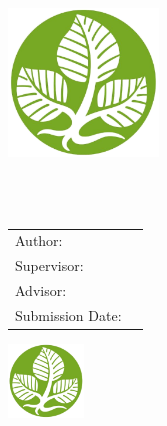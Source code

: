 \begin{titlepage}
  \centering

  \vspace{40mm}
  \includegraphics[width=40mm]{logos/hs}

  \vspace{5mm}
  {\huge\MakeUppercase{\getFaculty{}}}\\

  \vspace{5mm}
  {\large\MakeUppercase{\getUniversity{}}}\\

  \vspace{15mm}
  {\Large \getDoctype{}}

  \vspace{15mm}
  {\huge\bfseries \getTitle{}}

  \vspace{10mm}
  \begin{tabular}{l l}
    Author: & \getAuthor{} \\
    Supervisor: & \getSupervisor{} \\
    Advisor: & \getAdvisor{} \\
    Submission Date: & \getSubmissionDate{} \\
  \end{tabular}

  \vspace{10mm}
  \includegraphics[width=20mm]{logos/hs}
\end{titlepage}

